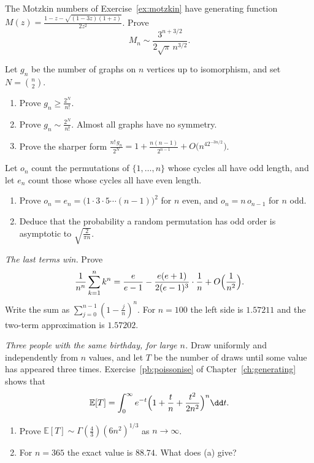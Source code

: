 \begin{exercise}[$\star\star$]\label{ex:motzkinasym}
The Motzkin numbers of Exercise~\ref{ex:motzkin} have generating function $M(z)=\frac{1-z-\sqrt{(1-3z)(1+z)}}{2z^2}$. Prove
\[
M_n\sim\frac{3^{n+3/2}}{2\sqrt\pi\,n^{3/2}}.
\]
\end{exercise}

\begin{exercise}[$\star\star\star$]\label{pb:unlabelled}
Let $g_n$ be the number of graphs on $n$ vertices up to isomorphism, and set $N=\binom n2$.
\begin{enumerate}[label=(\alph*)]
\item Prove $g_n\ge\frac{2^N}{n!}$.
\item Prove $g_n\sim\frac{2^N}{n!}$. Almost all graphs have no symmetry.
\item Prove the sharper form $\frac{n!\,g_n}{2^N}=1+\frac{n(n-1)}{2^{n-1}}+O\bigl(n^42^{-3n/2}\bigr)$.
\end{enumerate}
\end{exercise}

\begin{exercise}[$\star\star$]\label{pb:oddcycles}
Let $o_n$ count the permutations of $\{1,\dots,n\}$ whose cycles all have odd length, and let $e_n$ count those whose cycles all have even length.
\begin{enumerate}[label=(\alph*)]
\item Prove $o_n=e_n=\bigl(1\cdot3\cdot5\cdots(n-1)\bigr)^2$ for $n$ even, and $o_n=n\,o_{n-1}$ for $n$ odd.
\item Deduce that the probability a random permutation has odd order is asymptotic to $\sqrt{\frac2{\pi n}}$.
\end{enumerate}
\end{exercise}

\begin{exercise}[$\star$]\label{pb:powersum}
\emph{The last terms win.} Prove
\[
\frac1{n^n}\sum_{k=1}^nk^n=\frac e{e-1}-\frac{e(e+1)}{2(e-1)^3}\cdot\frac1n+O\Bigl(\frac1{n^2}\Bigr).
\]
Write the sum as $\sum_{j=0}^{n-1}(1-\frac jn)^n$. For $n=100$ the left side is $1.57211$ and the two-term approximation is $1.57202$.
\end{exercise}

\begin{exercise}[$\star\star$]\label{pb:birthdaytriple}
\emph{Three people with the same birthday, for large $n$.} Draw uniformly and independently from $n$ values, and let $T$ be the number of draws until some value has appeared three times. Exercise~\ref{pb:poissonise} of Chapter~\ref{ch:generating} shows that
\[
\mathbb E[T]=\int_0^\infty e^{-t}\Bigl(1+\frac tn+\frac{t^2}{2n^2}\Bigr)^n\dd t.
\]
\begin{enumerate}[label=(\alph*)]
\item Prove $\mathbb E[T]\sim\Gamma(\frac43)(6n^2)^{1/3}$ as $n\to\infty$.
\item For $n=365$ the exact value is $88.74$. What does (a) give?
\end{enumerate}
\end{exercise}


